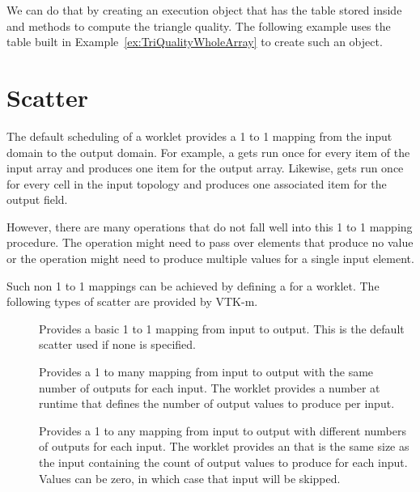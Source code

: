 We can do that by creating an execution object that has the table stored
inside and methods to compute the triangle quality. The following example
uses the table built in Example~\ref{ex:TriQualityWholeArray} to create
such an object.



\section{Scatter}
\label{sec:WorkletScatter}


The default scheduling of a worklet provides a 1 to 1 mapping from the
input domain to the output domain. For example, a
 gets run once for every item of the input
array and produces one item for the output array. Likewise,
 gets run once for every cell in the
input topology and produces one associated item for the output field.

However, there are many operations that do not fall well into this 1 to 1
mapping procedure. The operation might need to pass over elements that
produce no value or the operation might need to produce multiple values for
a single input element.

Such non 1 to 1 mappings can be achieved by defining a 
for a worklet. The following types of scatter are provided by VTK-m.

\begin{description}
\item[] Provides a basic 1 to 1 mapping from
  input to output. This is the default scatter used if none is specified.
\item[] Provides a 1 to many mapping from input
  to output with the same number of outputs for each input. The worklet
  provides a number at runtime that defines the number of output values to
  produce per input.
\item[] Provides a 1 to any mapping from input
  to output with different numbers of outputs for each input. The worklet
  provides an  that is the same size as the
  input containing the count of output values to produce for each input.
  Values can be zero, in which case that input will be skipped.
\end{description}

